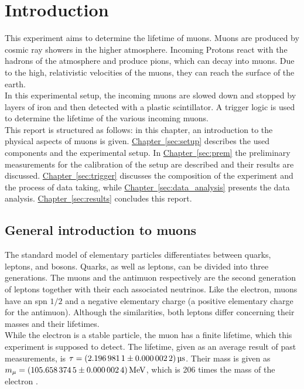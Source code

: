 \chapter{Introduction}
This experiment aims to determine the lifetime of muons. Muons are produced by cosmic ray showers 
in the higher atmosphere. Incoming Protons react with the hadrons of the atmosphere and produce 
pions, which can decay into muons. Due to the high, relativistic velocities of the muons, they can 
reach the surface of the earth. \\
In this experimental setup, the incoming muons are slowed down and stopped
by layers of iron and then detected with a plastic scintillator. A trigger logic is used to determine 
the lifetime of the various incoming muons.\\
This report is structured as follows: in this chapter, an introduction to the physical aspects of muons is given.
\hyperref[sec:setup]{Chapter~\ref*{sec:setup}} describes the used components and the experimental setup. In \hyperref[sec:prem]{Chapter~\ref*{sec:prem}}
the preliminary measurements for the calibration of the setup are described and their results are discussed. \hyperref[sec:trigger]{Chapter~\ref*{sec:trigger}} discusses
the composition of the experiment and the process of data taking, while \hyperref[sec:data_analysis]{Chapter~\ref*{sec:data_analysis}} 
presents the data analysis. \hyperref[sec:results]{Chapter~\ref*{sec:results}} concludes this report.


\newpage
\section{General introduction to muons}
The standard model of elementary particles differentiates between quarks, leptons, and bosons.
Quarks, as well as leptons, can be divided into three generations. The muons and the antimuon respectively 
are the second generation of leptons together with their each associated neutrinos. Like the electron,
muons have an spn $1/2$ and a negative elementary charge (a positive elementary charge for the antimuon).
Although the similarities, both leptons differ concerning their masses and their lifetimes.\\
While the electron is a stable particle, the muon has a finite lifetime, which this experiment is supposed 
to detect. The lifetime, given as an average result of past measurements, is $\tau = \SI{2.1969811 \pm 0.0000022}{\micro\second}$.
Their mass is given as $m_{\mu} = \SI{105.6583745 \pm 0.0000024}{\mega\eV}$, which 
is 206 times the mass of the electron \cite{pdg}.
